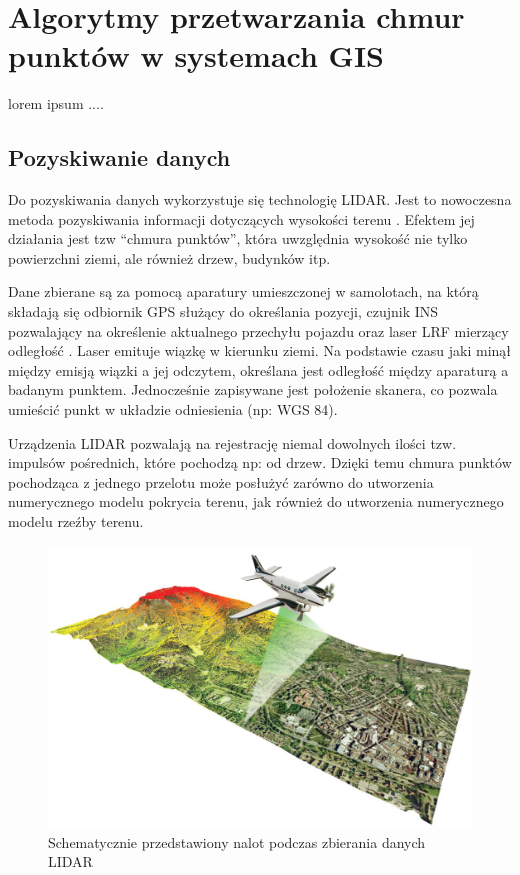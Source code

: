 \chapter{Algorytmy przetwarzania chmur punktów w systemach GIS}

lorem ipsum ....

\section{Pozyskiwanie danych}
Do pozyskiwania danych wykorzystuje się technologię LIDAR. Jest to nowoczesna metoda pozyskiwania informacji dotyczących wysokości terenu \cite{Marmol2003}. Efektem jej działania jest tzw “chmura punktów”, która uwzględnia wysokość nie tylko powierzchni ziemi, ale również drzew, budynków itp.

Dane zbierane są za pomocą aparatury umieszczonej w samolotach, na którą składają się odbiornik GPS służący do określania pozycji, czujnik INS pozwalający na określenie aktualnego przechyłu pojazdu oraz laser LRF mierzący odległość \cite{WBPW2012}. Laser emituje wiązkę w kierunku ziemi. Na podstawie czasu jaki minął między emisją wiązki a jej odczytem, określana jest odległość między aparaturą a badanym punktem. Jednocześnie zapisywane jest położenie skanera, co pozwala umieścić punkt w układzie odniesienia (np: WGS 84).

Urządzenia LIDAR pozwalają na rejestrację niemal dowolnych ilości tzw. impulsów pośrednich, które pochodzą np: od drzew. Dzięki temu chmura punktów pochodząca z jednego przelotu może posłużyć zarówno do utworzenia numerycznego modelu pokrycia terenu, jak również do utworzenia numerycznego modelu rzeźby terenu.

\begin{figure}[h!]
\centering
\includegraphics[width=1\textwidth]{img/LIDAR.jpg}
\caption{Schematycznie przedstawiony nalot podczas zbierania danych LIDAR}
\label{fig:lidar}
\end{figure}

